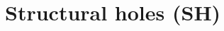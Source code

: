 \documentclass[8pt]{beamer}
\begin{document}






\section{Structural holes (SH)}

\bgroup
{}
\begin{frame}[plain]{}
\begin{center}
\color{white}{\Huge\insertsection}
\end{center}
\end{frame}
\egroup

\end{document}
